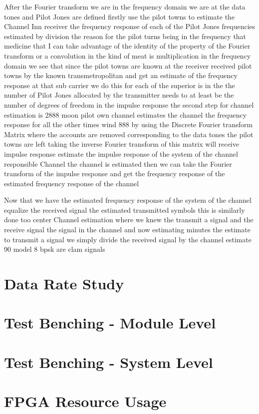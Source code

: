 \documentclass[]{book}
\begin{document}
After the Fourier transform we are in the frequency domain we are at the data tones and Pilot Jones are defined firstly use the pilot towns to estimate the Channel Inn receiver the frequency response of each of the Pilot Jones frequencies estimated by division the reason for the pilot turns being in the frequency that medicine that I can take advantage of the identity of the property of the Fourier transform or a convolution in the kind of meat is multiplication in the frequency domain we see that since the pilot towns are known at the receiver received pilot towns by the known transmetropolitan and get an estimate of the frequency response at that sub carrier we do this for each of the superior is in the the number of Pilot Jones allocated by the transmitter needs to at least be the number of degrees of freedom in the impulse response the second step for channel estimation is 2888 moon pilot own channel estimates the channel the frequency response for all the other times wind 888 by using the Discrete Fourier transform Matrix where the accounts are removed corresponding to the data tones the pilot towns are left taking the inverse Fourier transform of this matrix will receive impulse response estimate the impulse response of the system of the channel responsible Channel the channel is estimated then we can take the Fourier transform of the impulse response and get the frequency response of the estimated frequency response of the channel

Now that we have the estimated frequency response of the system of the channel equalize the received signal the estimated transmitted symbols this is similarly done too center Channel estimation where we knew the transmit a signal and the receive signal the signal in the channel and now estimating minutes the estimate to transmit a signal we simply divide the received signal by the channel estimate 90 model 8 bpsk are clam signals

\section{Data Rate Study}
\section{Test Benching - Module Level}
\section{Test Benching - System Level}
\section{FPGA Resource Usage}
























\end{document}
